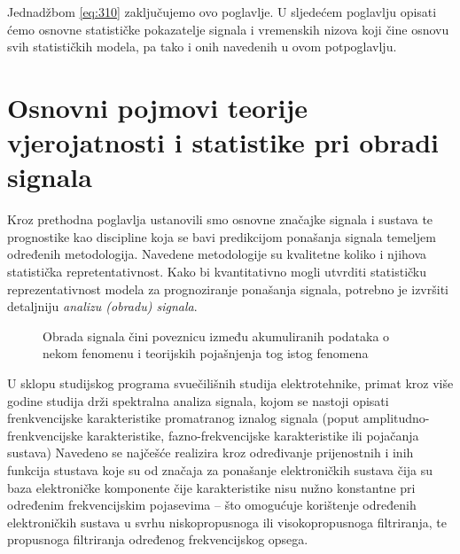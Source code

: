 \documentclass[a4paper,12pt,oneside]{memoir}
\begin{document}
                Jednadžbom \eqref{eq:310} zaključujemo ovo poglavlje. U sljedećem poglavlju opisati ćemo osnovne statističke pokazatelje signala i vremenskih nizova koji čine osnovu svih statističkih modela, pa tako i onih navedenih u ovom potpoglavlju.        

    \chapter{Osnovni pojmovi teorije vjerojatnosti i statistike pri obradi signala}


        Kroz prethodna poglavlja ustanovili smo osnovne značajke signala i sustava te prognostike kao discipline koja se bavi predikcijom ponašanja signala temeljem određenih metodologija. Navedene metodologije su kvalitetne koliko i njihova statistička repretentativnost. Kako bi kvantitativno mogli utvrditi statističku reprezentativnost modela za prognoziranje ponašanja signala, potrebno je izvršiti detaljniju \textit{analizu (obradu) signala}.

        \begin{figure}[H]
            \centering
            \caption{Obrada signala čini poveznicu između akumuliranih podataka o nekom fenomenu i teorijskih pojašnjenja tog istog fenomena \cite{Broersen}}
            \label{fig:41}
        \end{figure}
        
        U sklopu studijskog programa svuečilišnih studija elektrotehnike, primat kroz više godine studija drži spektralna analiza signala, kojom se nastoji opisati frenkvencijske karakteristike promatranog iznalog signala (poput amplitudno-frenkvencijske karakteristike, fazno-frekvencijske karakteristike ili pojačanja sustava) Navedeno se najčešće realizira kroz određivanje prijenostnih i inih funkcija stustava koje su od značaja za ponašanje elektroničkih sustava čija su baza elektroničke komponente čije karakteristike nisu nužno konstantne pri određenim frekvencijskim pojasevima -- što omogućuje korištenje određenih elektroničkih sustava u svrhu niskopropusnoga ili visokopropusnoga filtriranja, te propusnoga filtriranja određenog frekvencijskog opsega.
\end{document}

